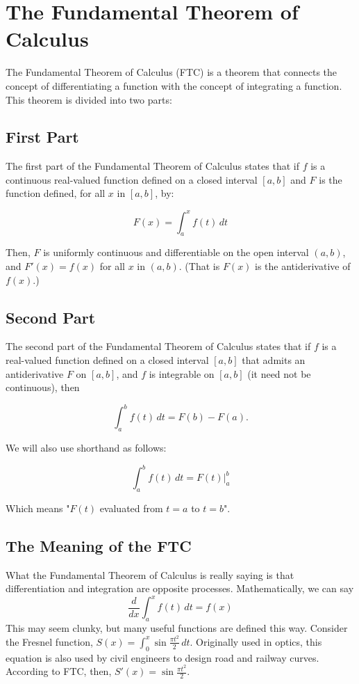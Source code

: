 \chapter{The Fundamental Theorem of Calculus}

The Fundamental Theorem of Calculus (FTC) is a theorem that connects the
concept of differentiating a function with the concept of integrating
a function. This theorem is divided into two parts:

\section{First Part}

The first part of the Fundamental Theorem of Calculus states that if
$f$ is a continuous real-valued function defined on a closed interval
$[a, b]$ and $F$ is the function defined, for all $x$ in $[a, b]$, by:

\begin{equation}
F(x) = \int_a^x f(t) \, dt
\end{equation}

Then, $F$ is uniformly continuous and differentiable on the open
interval $(a, b)$, and $F'(x) = f(x)$ for all $x$ in $(a, b)$.
(That is $F(x)$ is the antiderivative of $f(x)$.)

\section{Second Part}

The second part of the Fundamental Theorem of Calculus states that if
$f$ is a real-valued function defined on a closed interval $[a, b]$
that admits an antiderivative $F$ on $[a, b]$, and $f$ is integrable
on $[a, b]$ (it need not be continuous), then

\begin{equation}
\int_a^b f(t) \, dt = F(b) - F(a).
\end{equation}

We will also use shorthand as follows:

\begin{equation}
\int_a^b f(t)\,dt = F(t)|_a^b
\end{equation}

Which means "$F(t)$ evaluated from $t=a$ to $t=b$". 

\section{The Meaning of the FTC}
What the Fundamental Theorem of Calculus is really saying is that 
differentiation and integration are opposite processes. Mathematically, 
we can say $$\frac{d}{dx} \int_{a}^{x} f(t)\,dt = f(x)$$
This may seem clunky, but many useful functions are defined this way. 
Consider the Fresnel function, $S(x) = \int_{0}^{x}\sin{
\frac{\pi t^2}{2}}\,dt$. Originally used in optics, this equation is 
also used by civil engineers to design road and railway curves. 
According to FTC, then, $S'(x) = \sin{\frac{\pi t^2}{2}}$. 


